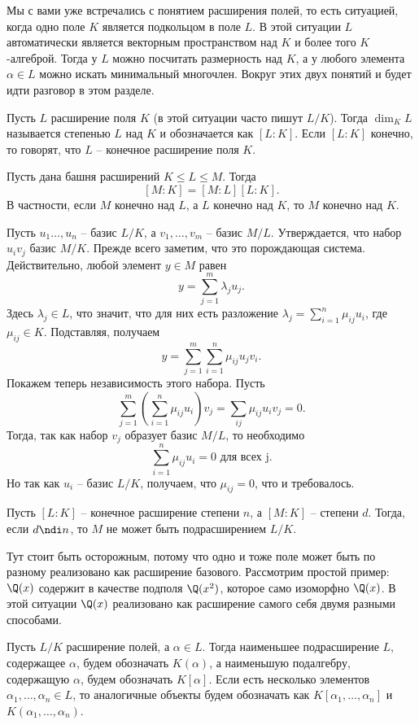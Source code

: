 Мы с вами уже встречались с понятием расширения полей, то есть ситуацией, когда одно поле $K$ является подкольцом в поле $L$. В этой ситуации $L$ автоматически является векторным пространством над $K$ и более того $K$-алгеброй. Тогда у $L$ можно посчитать размерность над $K$, а у любого элемента $\alpha \in L$ можно искать минимальный многочлен. Вокруг этих двух понятий и будет идти разговор в этом разделе.  


 Пусть $L$ расширение поля $K$ (в этой ситуации часто пишут $L/K$). Тогда $\dim_K L$ называется степенью $L$ над $K$ и обозначается как $[L:K]$. Если $[L: K]$ конечно, то говорят, что $L$ -- конечное расширение поля $K$. 
\edfn

 Пусть дана башня расширений $K\leq L \leq M$. Тогда 
$$[M: K]=[M: L][L: K].$$
В частности, если $M$ конечно над $L$, а $L$ конечно над $K$, то $M$ конечно над $K$.


\proof Пусть $u_1\dots,u_n$ -- базис $L/K$, а $v_1,\dots,v_m$ -- базис $M/L$. Утверждается, что набор $u_iv_j$ базис $M/K$.
Прежде всего заметим, что это порождающая система. Действительно, любой элемент $y\in M$ равен 
$$y=\sum_{j=1}^m \lambda_j u_j. $$
Здесь $\lambda_j \in L$, что значит, что для них есть разложение $\lambda_j=\sum_{i=1}^n \mu_{ij} u_i$, где $\mu_{ij}\in K$. Подставляя, получаем 
$$ y=\sum_{j=1}^m\sum_{i=1}^n \mu_{ij} u_jv_i.$$
Покажем теперь независимость этого набора. Пусть
$$\sum_{j=1}^m\left(\sum_{i=1}^n \mu_{ij}u_i\right)v_j=\sum_{ij}\mu_{ij} u_i v_j=0.$$
Тогда, так как набор $v_j$ образует базис $M/L$, то необходимо
$$\sum_{i=1}^n \mu_{ij}u_i=0 \text{ для всех j}.$$
Но так как $u_i$ -- базис $L/K$, получаем, что $\mu_{ij}=0$, что и требовалось.
\endproof
 
\ethrm

\crl Пусть $[L: K]$ -- конечное расширение степени $n$, а $[M:K]$ -- степени $d$. Тогда, если $d \ndi n$, то $M$ не может быть подрасширением $L/K$.
\ecrl

\rm Тут стоит быть осторожным, потому что одно и тоже поле может быть по разному реализовано как расширение базового. Рассмотрим простой пример: $\Q(x)$ содержит в качестве подполя $\Q(x^2)$, которое само изоморфно $\Q(x)$. В этой ситуации $\Q(x)$ реализовано как расширение самого себя двумя разными способами.
\erm

\dfn Пусть $L/K$ расширение полей, а $\alpha \in L$. Тогда наименьшее подрасширение $L$, содержащее $\alpha$, будем обозначать $K(\alpha)$, а наименьшую подалгебру, содержащую $\alpha$, будем обозначать $K[\alpha]$. Если есть несколько элементов $\alpha_1,\dots,\alpha_n\in L$, то аналогичные объекты будем обозначать как $K[\alpha_1,\dots,\alpha_n]$ и $K(\alpha_1,\dots,\alpha_n)$.
\edfn



